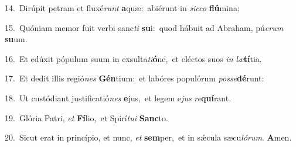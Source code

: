 {\numbfont\textcolor{\numbcolor}{14.}}~Dirúpit petram et fluxé\textit{runt} \textbf{a}\-quæ:~\star abiérunt in \textit{sic}\-\textit{co} \textbf{flú}\-mina;\par
{\numbfont\textcolor{\numbcolor}{15.}}~Quóniam memor fuit verbi sanc\textit{ti} \textbf{su}\-i:~\star quod hábuit ad Abraham, pú\-\textit{e}\-\textit{rum} \textbf{su}\-um.\par
{\numbfont\textcolor{\numbcolor}{16.}}~Et edúxit pópulum suum in exsulta\-\textit{ti}\-\textbf{ó}ne,~\star et eléctos suos \textit{in} \textit{læ}\-\textbf{tí}tia.\par
{\numbfont\textcolor{\numbcolor}{17.}}~Et dedit illis regió\textit{nes} \textbf{Gén}\-tium:~\star et labóres populórum \textit{pos}\-\textit{se}\textbf{dé}runt:\par
{\numbfont\textcolor{\numbcolor}{18.}}~Ut custódiant justificatió\textit{nes} \textbf{e}\-jus,~\star et legem e\textit{jus} \textit{re}\-\textbf{quí}rant.\par
{\numbfont\textcolor{\numbcolor}{19.}}~Glória Patri, \textit{et} \textbf{Fí}\-lio,~\star et Spirí\-\textit{tu}\-\textit{i} \textbf{Sanc}\-to.\par
{\numbfont\textcolor{\numbcolor}{20.}}~Sicut erat in princípio, et nunc, \textit{et} \textbf{sem}\-per,~\star et in sǽcula sæcu\-\textit{ló}\-\textit{rum}. \textbf{A}\-men.\par
